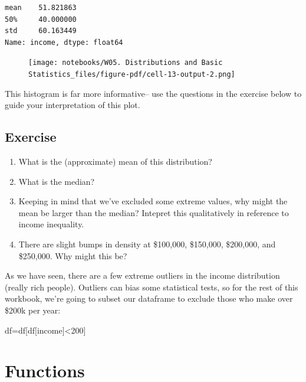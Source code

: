\documentclass[
  letterpaper,
  DIV=11,
  numbers=noendperiod]{scrreprt}
\newenvironment{Shaded}{\begin{snugshade}}{\end{snugshade}}
\newcommand{\DecValTok}[1]{\textcolor[rgb]{0.68,0.00,0.00}{#1}}
\newcommand{\NormalTok}[1]{\textcolor[rgb]{0.00,0.23,0.31}{#1}}
\newcommand{\OperatorTok}[1]{\textcolor[rgb]{0.37,0.37,0.37}{#1}}
\newcommand{\StringTok}[1]{\textcolor[rgb]{0.13,0.47,0.30}{#1}}
\providecommand{\tightlist}{%
  \setlength{\itemsep}{0pt}\setlength{\parskip}{0pt}}\usepackage{longtable,booktabs,array}
\begin{document}
\begin{verbatim}
mean    51.821863
50%     40.000000
std     60.163449
Name: income, dtype: float64
\end{verbatim}

\begin{figure}[H]

{\centering \texttt{[image: notebooks/W05. Distributions and Basic Statistics\_files/figure-pdf/cell-13-output-2.png]}

}

\end{figure}

This histogram is far more informative-- use the questions in the
exercise below to guide your interpretation of this plot.

\hypertarget{exercise-12}{%
\subsection{Exercise}\label{exercise-12}}

\begin{enumerate}
\def\labelenumi{\arabic{enumi}.}
\tightlist
\item
  What is the (approximate) mean of this distribution?
\item
  What is the median?
\item
  Keeping in mind that we've excluded some extreme values, why might the
  mean be larger than the median? Intepret this qualitatively in
  reference to income inequality.
\item
  There are slight bumps in density at \$100,000, \$150,000, \$200,000,
  and \$250,000. Why might this be?
\end{enumerate}

As we have seen, there are a few extreme outliers in the income
distribution (really rich people). Outliers can bias some statistical
tests, so for the rest of this workbook, we're going to subset our
dataframe to exclude those who make over \$200k per year:

\begin{Shaded}
\begin{Highlighting}[]
\NormalTok{df}\OperatorTok{=}\NormalTok{df[df[}\StringTok{\textquotesingle{}income\textquotesingle{}}\NormalTok{]}\OperatorTok{\textless{}}\DecValTok{200}\NormalTok{]}
\end{Highlighting}
\end{Shaded}

\hypertarget{functions}{%
\section{Functions}\label{functions}}
\end{document}
